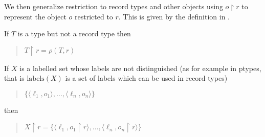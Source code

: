 \begin{shaded}
\begin{ex}
\begin{subex}
 
\item
  \begin{prooftree}
  \end{prooftree}
  
  \begin{prooftree}
  \end{prooftree}
  \hspace*{2em}
  \begin{prooftree}
  \end{prooftree}
  \hspace*{2em}
  \begin{prooftree}
  \end{prooftree}

  
  
 
\end{subex} 
   
\end{ex}

We then generalize restriction to record types and other objects using
$o\!\restriction\!r$ to represent the object $o$ restricted to $r$.
This is given by the definition in \nexteg{}.
\begin{ex} 
\begin{subex} 
 
\item If $T$ is a type but not a record type then
  \begin{quote}
    $T\!\restriction\!r=\rho(T,r)$
  \end{quote}
  
 
\item If $X$ is a labelled set whose labels are not distinguished (as
  for example in ptypes, that is $\mathrm{labels}(X)$ is a set of
  labels which can be used in record types)
  \begin{quote}
    $\{\langle\ell_1,o_1\rangle,\ldots,\langle\ell_n,o_n\rangle\}$
  \end{quote}
  then
  \begin{quote}
    $X\!\restriction\!r=\{\langle\ell_1,o_1\!\restriction\!r\rangle,\ldots,\langle\ell_n,o_n\!\restriction\!r\rangle\}$
  \end{quote}


\end{subex}
\end{ex}
\end{shaded}

